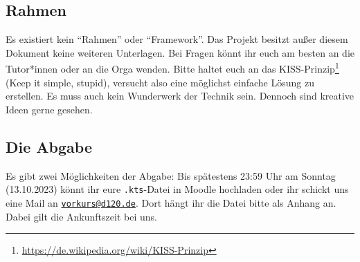 \clearpage
\subsection*{Rahmen}
Es existiert kein \enquote{Rahmen} oder \enquote{Framework}.
Das Projekt besitzt außer diesem Dokument keine weiteren Unterlagen.
Bei Fragen könnt ihr euch am besten an die Tutor*innen oder an die Orga wenden.
Bitte haltet euch an das KISS-Prinzip\footnote[2]{\url{https://de.wikipedia.org/wiki/KISS-Prinzip}} (Keep it simple, stupid), versucht also eine möglichst einfache Lösung zu erstellen.
Es muss auch kein Wunderwerk der Technik sein.
Dennoch sind kreative Ideen gerne gesehen.

\subsection*{Die Abgabe}
Es gibt zwei Möglichkeiten der Abgabe: Bis spätestens 23:59 Uhr am Sonntag (13.10.2023) könnt ihr eure \texttt{.kts}-Datei in Moodle hochladen oder ihr schickt uns eine Mail an \href{mailto:vorkurs@d120.de}{\nolinkurl{vorkurs@d120.de}}.
Dort hängt ihr die Datei bitte als Anhang an.
Dabei gilt die Ankunftszeit bei uns.

